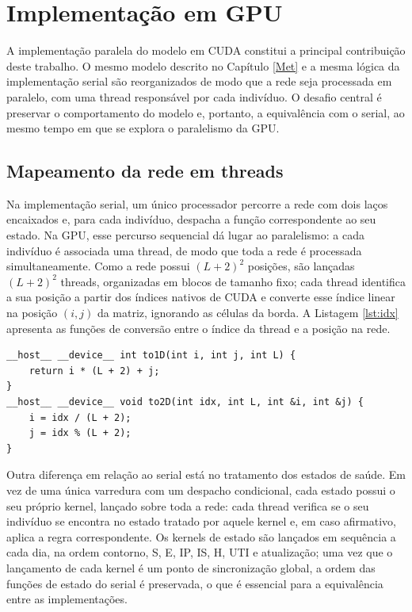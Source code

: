 \chapter{Implementação em GPU}
\label{cap:gpu}

A implementação paralela do modelo em CUDA constitui a principal contribuição deste trabalho. O mesmo modelo descrito no Capítulo \ref{Met} e a mesma lógica da implementação serial são reorganizados de modo que a rede seja processada em paralelo, com uma thread responsável por cada indivíduo. O desafio central é preservar o comportamento do modelo e, portanto, a equivalência com o serial, ao mesmo tempo em que se explora o paralelismo da GPU.

\section{Mapeamento da rede em threads}

Na implementação serial, um único processador percorre a rede com dois laços encaixados e, para cada indivíduo, despacha a função correspondente ao seu estado. Na GPU, esse percurso sequencial dá lugar ao paralelismo: a cada indivíduo é associada uma thread, de modo que toda a rede é processada simultaneamente. Como a rede possui $(L+2)^2$ posições, são lançadas $(L+2)^2$ threads, organizadas em blocos de tamanho fixo; cada thread identifica a sua posição a partir dos índices nativos de CUDA e converte esse índice linear na posição $(i, j)$ da matriz, ignorando as células da borda. A Listagem \ref{lst:idx} apresenta as funções de conversão entre o índice da thread e a posição na rede.

\begin{lstlisting}[caption={Conversão entre o índice da thread e a posição na rede.}, label={lst:idx}]
__host__ __device__ int to1D(int i, int j, int L) {
    return i * (L + 2) + j;
}
__host__ __device__ void to2D(int idx, int L, int &i, int &j) {
    i = idx / (L + 2);
    j = idx % (L + 2);
}
\end{lstlisting}

Outra diferença em relação ao serial está no tratamento dos estados de saúde. Em vez de uma única varredura com um despacho condicional, cada estado possui o seu próprio kernel, lançado sobre toda a rede: cada thread verifica se o seu indivíduo se encontra no estado tratado por aquele kernel e, em caso afirmativo, aplica a regra correspondente. Os kernels de estado são lançados em sequência a cada dia, na ordem contorno, S, E, IP, IS, H, UTI e atualização; uma vez que o lançamento de cada kernel é um ponto de sincronização global, a ordem das funções de estado do serial é preservada, o que é essencial para a equivalência entre as implementações.

